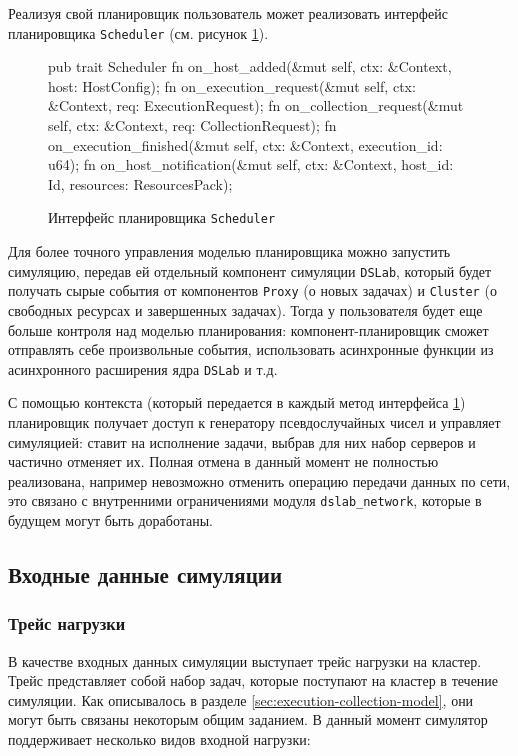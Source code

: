 Реализуя свой планировщик пользователь может реализовать интерфейс планировщика \texttt{Scheduler} (см. рисунок \ref{fig:scheduler-interface}). 

\begin{figure}[h!]
    \footnotesize
    \begin{rustcode}
pub trait Scheduler {
  fn on_host_added(&mut self, ctx: &Context, host: HostConfig);
  fn on_execution_request(&mut self, ctx: &Context, req: ExecutionRequest);
  fn on_collection_request(&mut self, ctx: &Context, req: CollectionRequest);
  fn on_execution_finished(&mut self, ctx: &Context, execution_id: u64);
  fn on_host_notification(&mut self, ctx: &Context, host_id: Id, resources: ResourcesPack);
}
    \end{rustcode}
    \caption{Интерфейс планировщика \texttt{Scheduler}}
    \label{fig:scheduler-interface}
\end{figure}

Для более точного управления моделью планировщика можно запустить симуляцию, передав ей отдельный компонент симуляции \texttt{DSLab}, который будет получать сырые события от компонентов \texttt{Proxy} (о новых задачах) и \texttt{Cluster} (о свободных ресурсах и завершенных задачах). Тогда у пользователя будет еще больше контроля над моделью планирования: компонент-планировщик сможет отправлять себе произвольные события, использовать асинхронные функции из асинхронного расширения ядра \texttt{DSLab} и т.д.

С помощью контекста (который передается в каждый метод интерфейса \ref{fig:scheduler-interface}) планировщик получает доступ к генератору псевдослучайных чисел и управляет симуляцией: ставит на исполнение задачи, выбрав для них набор серверов и частично отменяет их. Полная отмена в данный момент не полностью реализована, например невозможно отменить операцию передачи данных по сети, это связано с внутренними ограничениями  модуля \texttt{dslab\_network}, которые в будущем могут быть доработаны.

\subsection{Входные данные симуляции}

\subsubsection{Трейс нагрузки}\label{sec:input-format-trace}

В качестве входных данных симуляции выступает трейс нагрузки на кластер. Трейс представляет собой набор задач, которые поступают на кластер в течение симуляции. Как описывалось в разделе \ref{sec:execution-collection-model}, они могут быть связаны некоторым общим заданием. В данный момент симулятор поддерживает несколько видов входной нагрузки: 

